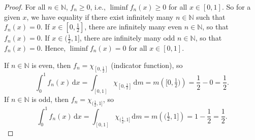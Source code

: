 \documentclass[12pt]{article}
\newcommand{\N}{\mathbb{N}}
\newcommand{\<}{\langle}
\renewcommand{\>}{\rangle}
\newcommand{\dd}[1]{\,\mathrm{d}#1}
\newcommand{\of}[1]{\!\left(#1\right)}
\begin{document}
\begin{proof}
    For all $n \in \N$, $f_n \geq 0$, i.e., $\liminf f_n(x) \geq 0$ for all $x \in [0, 1]$. So for a given $x$, we have equality if there exist infinitely many $n \in \N$ such that $f_n(x) = 0$. If $x \in [0, \frac{1}{2}]$, there are infinitely many even $n \in \N$, so that $f_n(x) = 0$. If $x \in (\frac{1}{2}, 1]$, there are infinitely many odd $n \in \N$, so that $f_n(x) = 0$. Hence, $\liminf f_n(x) = 0$ for all $x \in [0, 1]$.

    If $n \in \N$ is even, then $f_n = \chi_{[0, \frac{1}{2}]}$ (indicator function), so
    \[
        \int_0^1 f_n(x) \dd{x}
            = \int_{[0, 1]} \chi_{[0, \frac{1}{2}]} \dd{m}
            = m\of{[0, \tfrac{1}{2})}
            = \frac{1}{2} - 0
            = \frac{1}{2}.
    \]
    If $n \in \N$ is odd, then $f_n = \chi_{(\frac{1}{2}, 1]}$, so
    \[
        \int_0^1 f_n(x) \dd{x}
            = \int_{[0, 1]} \chi_{(\frac{1}{2}, 1]} \dd{m}
            = m\of{(\tfrac{1}{2}, 1]}
            = 1 - \frac{1}{2}
            = \frac{1}{2}.
    \]

\end{proof}
\end{document}
